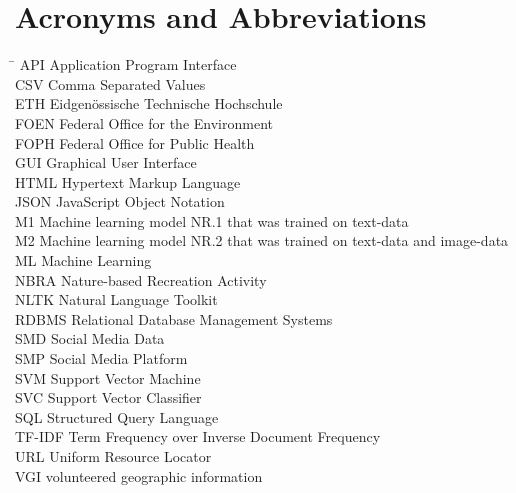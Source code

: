 
\section*{Acronyms and Abbreviations}
\begin{tabbing}
 \hspace*{1.6cm}  \= \kill
 API \> Application Program Interface \\
 CSV \> Comma Separated Values \\
 ETH \> Eidgen\"{o}ssische Technische Hochschule \\
 FOEN \> Federal Office for the Environment \\
 FOPH \> Federal Office for Public Health \\
 GUI \> Graphical User Interface \\
 HTML \> Hypertext Markup Language \\
 JSON \> JavaScript Object Notation \\
 M1 \> Machine learning model NR.1 that was trained on text-data \\
 M2 \> Machine learning model NR.2 that was trained on text-data and image-data \\
 ML \> Machine Learning \\
 NBRA \> Nature-based Recreation Activity \\%
 NLTK \> Natural Language Toolkit \\ 
 RDBMS \> Relational Database Management Systems \\
 SMD \> Social Media Data \\
 SMP \> Social Media Platform \\
 SVM \> Support Vector Machine \\
 SVC \> Support Vector Classifier \\
 SQL \> Structured Query Language \\
 TF-IDF \> Term Frequency over Inverse Document Frequency \\
 URL \> Uniform Resource Locator \\ 
 VGI \> volunteered geographic information
\end{tabbing}

